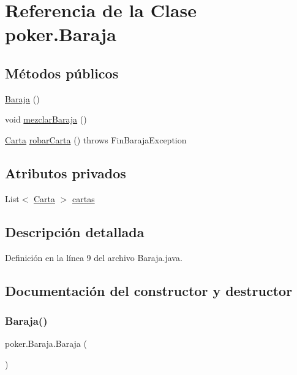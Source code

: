 \hypertarget{classpoker_1_1Baraja}{}\section{Referencia de la Clase poker.\+Baraja}
\label{classpoker_1_1Baraja}
\subsection*{Métodos públicos}
\begin{DoxyCompactItemize}
\item 
\mbox{\hyperlink{classpoker_1_1Baraja_aa3003f220dd7f18565095c2f34bc4ff7}{Baraja}} ()
\item 
void \mbox{\hyperlink{classpoker_1_1Baraja_a83f7910d78df1da64aefdf640a9fefe7}{mezclar\+Baraja}} ()
\item 
\mbox{\hyperlink{classpoker_1_1Carta}{Carta}} \mbox{\hyperlink{classpoker_1_1Baraja_a2eaf33a7d657fb1f5181d0c5307c300b}{robar\+Carta}} ()  throws Fin\+Baraja\+Exception 
\end{DoxyCompactItemize}
\subsection*{Atributos privados}
\begin{DoxyCompactItemize}
\item 
List$<$ \mbox{\hyperlink{classpoker_1_1Carta}{Carta}} $>$ \mbox{\hyperlink{classpoker_1_1Baraja_a267e10bf1a0fadd4b1bfa3f243fdfcf6}{cartas}}
\end{DoxyCompactItemize}


\subsection{Descripción detallada}


Definición en la línea 9 del archivo Baraja.\+java.



\subsection{Documentación del constructor y destructor}
\mbox{\label{classpoker_1_1Baraja_aa3003f220dd7f18565095c2f34bc4ff7}} 
\subsubsection{\texorpdfstring{Baraja()}{Baraja()}}
{\footnotesize\ttfamily poker.\+Baraja.\+Baraja (\begin{DoxyParamCaption}{ }\end{DoxyParamCaption})}



